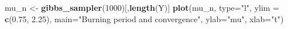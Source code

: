 \documentclass[]{article}
\newenvironment{Shaded}{\begin{snugshade}}{\end{snugshade}}
\newcommand{\DataTypeTok}[1]{\textcolor[rgb]{0.13,0.29,0.53}{#1}}
\newcommand{\DecValTok}[1]{\textcolor[rgb]{0.00,0.00,0.81}{#1}}
\newcommand{\FloatTok}[1]{\textcolor[rgb]{0.00,0.00,0.81}{#1}}
\newcommand{\KeywordTok}[1]{\textcolor[rgb]{0.13,0.29,0.53}{\textbf{#1}}}
\newcommand{\NormalTok}[1]{#1}
\newcommand{\StringTok}[1]{\textcolor[rgb]{0.31,0.60,0.02}{#1}}
\begin{document}
\begin{Shaded}
\begin{Highlighting}[]
\NormalTok{mu_n <-}\StringTok{ }\KeywordTok{gibbs_sampler}\NormalTok{(}\DecValTok{1000}\NormalTok{)[,}\KeywordTok{length}\NormalTok{(Y)]}
\KeywordTok{plot}\NormalTok{(mu_n, }\DataTypeTok{type=}\StringTok{"l"}\NormalTok{, }\DataTypeTok{ylim =} \KeywordTok{c}\NormalTok{(}\FloatTok{0.75}\NormalTok{, }\FloatTok{2.25}\NormalTok{), }\DataTypeTok{main=}\StringTok{"Burning period and convergence"}\NormalTok{,}
     \DataTypeTok{ylab=}\StringTok{"mu"}\NormalTok{, }\DataTypeTok{xlab=}\StringTok{"t"}\NormalTok{)}
\end{Highlighting}
\end{Shaded}
\end{document}
